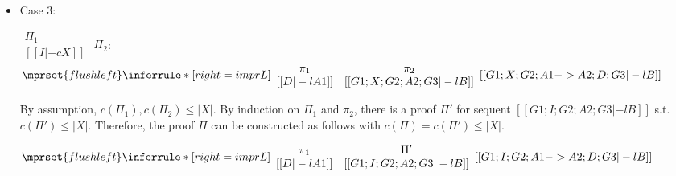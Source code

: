 \begin{itemize}
\item Case 3:
      \begin{center}
        \scriptsize
        \begin{math}
          \begin{array}{c}
            \Pi_1 \\
            {[[I |-c X]]}
          \end{array}
        \end{math}
        \qquad\qquad
        $\Pi_2$:
        \begin{math}
          $$\mprset{flushleft}
          \inferrule* [right={\tiny imprL}] {
            {
              \begin{array}{cc}
                \pi_1 & \pi_2 \\
                {[[D |-l A1]]} & {[[G1; X; G2; A2; G3 |-l B]]}
              \end{array}
            }
          }{[[G1; X; G2; A1 -> A2; D; G3 |-l B]]}
        \end{math}
      \end{center}
      By assumption, $c(\Pi_1),c(\Pi_2)\leq |X|$. By induction on $\Pi_1$
      and $\pi_2$, there is a proof $\Pi'$ for sequent
      $[[G1; I; G2; A2; G3 |-l B]]$ s.t. $c(\Pi') \leq |X|$. Therefore,
      the proof $\Pi$ can be constructed as follows with
      $c(\Pi) = c(\Pi') \leq |X|$.
      \begin{center}
        \scriptsize
        \begin{math}
          $$\mprset{flushleft}
          \inferrule* [right={\tiny imprL}] {
            {
              \begin{array}{cc}
                \pi_1 & \Pi' \\
                {[[D |-l A1]]} & {[[G1; I; G2; A2; G3 |-l B]]}
              \end{array}
            }
          }{[[G1; I; G2; A1 -> A2; D; G3 |-l B]]}
        \end{math}
      \end{center}


\end{itemize}
